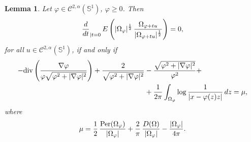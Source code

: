 \documentclass[10pt,reqno,english]{amsart}
\newcommand{\Su}{\mathbb{S}^1}
\newtheorem{lemma}{Lemma}[section]
\theoremstyle{definition}
\numberwithin{equation}{section}
\begin{document}
\begin{lemma}\label{lemma1n}
Let $\varphi\in\mathcal C^{2,\alpha}(\Su)$, $\varphi\ge0$. Then
\[
{d \over dt}_{| t=0} \, E \left( |\Omega_\varphi |^{1\over 2} \, {\Omega_{\varphi +t u} \over |\Omega_{\varphi+tu}|^{1\over 2}} \right) =0,
\]
for all $u\in \mathcal C^{2,\alpha}(\Su)$, if and only if
\[
\begin{split}
-\mathrm{div}\left(\frac{\nabla\varphi}{\varphi\sqrt{ \varphi^2 + |\nabla \varphi|^2}}\right)+\frac{2}{\sqrt{ \varphi^2 + |\nabla \varphi|^2}}&-\frac{\sqrt{ \varphi^2 + |\nabla \varphi|^2}}{\varphi^2}+ \\
&+{1\over 2\pi} \int_{\Omega_\varphi}    \log {1 \over |x - \varphi (z)   z| }\, dz=\mu ,
\end{split}
\]
where
\[
\mu= {1 \over 2} \, {{\mathrm{Per}} (\Omega_{\varphi }) \over  |\Omega_\varphi |} + {2\over \pi}  \,\frac{D(\Omega)}{|\Omega_\varphi |} -{|\Omega_\varphi |\over 4\pi} .
\]
\end{lemma}
\end{document}
